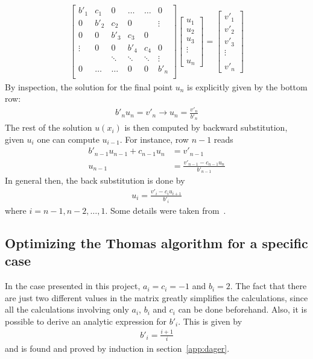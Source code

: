 \documentclass[aps,reprint]{revtex4-1}
\begin{document}
\begin{align*}
  \begin{bmatrix}
    b'_1 & c_1 & 0  & \hdots & \hdots &   0    \\
    0 & b'_2 & c_2 & 0      & &\vdots \\
    0 & 0 & b'_3  & c_3     & 0 &  \\
    \vdots & 0 & 0  & b'_4     & c_4 & 0 \\
    & & \ddots & \ddots & \ddots & \vdots\\
    0 & \hdots  &\hdots & 0 &0 & b'_n \\
  \end{bmatrix}
  \begin{bmatrix}
    u_1 \\ u_2 \\ u_3 \\ \vdots \\ \\ u_n
  \end{bmatrix}
  =
  \begin{bmatrix}
    v'_1 \\ v'_2 \\ v'_3 \\ \vdots \\ \\ v'_n
  \end{bmatrix}
\end{align*}
By inspection, the solution for the final point $u_n$ is explicitly given by the
bottom row:
\begin{align*}
  b'_n u_n = v'_n \rightarrow u_n = \frac{v'_n}{b'_n}
\end{align*}
The rest of the solution $u(x_i)$ is then computed by backward substitution, given
$u_i$ one can compute $u_{i-1}$. For instance, row $n-1$ reads
\begin{align*}
  b'_{n-1} u_{n-1} + c_{n-1} u_n &= v'_{n-1} \\
  u_{n-1} &= \frac{v'_{n-1} - c_{n-1} u_n}{b'_{n-1}}
\end{align*}
In general then, the back substitution is done by
\begin{align*}
  u_i = \frac{v'_i - c_i u_{i+1}}{b'_i}
\end{align*}
where $i = n-1, n-2, \hdots, 1$. Some details were taken from~\cite{mortenjensen}.
\subsection{Optimizing the Thomas algorithm for a specific case}
In the case presented in this project, $a_i = c_i = -1$ and $b_i = 2$. The fact
that there are just two different values in the matrix greatly simplifies the
calculations, since all the calculations involving only $a_i$, $b_i$ and $c_i$
can be done beforehand. Also, it is possible to derive an analytic expression for
$b'_i$. This is given by
\begin{align*}
  b'_i = \frac{i+1}{i}
\end{align*}
and is found and proved by induction in section~\ref{app:dager}.
\end{document}

